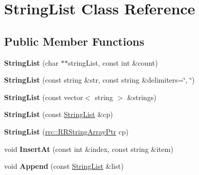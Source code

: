 \hypertarget{classrrc_1_1_string_list}{\section{String\-List Class Reference}
\label{classrrc_1_1_string_list}
}
\subsection*{Public Member Functions}
\begin{DoxyCompactItemize}
\item 
\hypertarget{classrrc_1_1_string_list_ae1e0bca30bc21edd66e7dd2b539273f4}{{\bfseries String\-List} (char $\ast$$\ast$string\-List, const int \&count)}\label{classrrc_1_1_string_list_ae1e0bca30bc21edd66e7dd2b539273f4}

\item 
\hypertarget{classrrc_1_1_string_list_a6306d63c1e79ab13cb62c1937722a06f}{{\bfseries String\-List} (const string \&str, const string \&delimiters=\char`\"{}, \char`\"{})}\label{classrrc_1_1_string_list_a6306d63c1e79ab13cb62c1937722a06f}

\item 
\hypertarget{classrrc_1_1_string_list_aec20e4743e6cebb9a3c14f04eee6ea5b}{{\bfseries String\-List} (const vector$<$ string $>$ \&strings)}\label{classrrc_1_1_string_list_aec20e4743e6cebb9a3c14f04eee6ea5b}

\item 
\hypertarget{classrrc_1_1_string_list_a2c6607735f8c410ce3ab82c1b88fc6f7}{{\bfseries String\-List} (const \hyperlink{classrrc_1_1_string_list}{String\-List} \&cp)}\label{classrrc_1_1_string_list_a2c6607735f8c410ce3ab82c1b88fc6f7}

\item 
\hypertarget{classrrc_1_1_string_list_a6dcfcea51506e87c9bbb2cf3f65751f7}{{\bfseries String\-List} (\hyperlink{rrc__types_8h_a7c9475df6c7337d99482b13a365e7596}{rrc\-::\-R\-R\-String\-Array\-Ptr} cp)}\label{classrrc_1_1_string_list_a6dcfcea51506e87c9bbb2cf3f65751f7}

\item 
\hypertarget{classrrc_1_1_string_list_ac3831ed58535977c2188dff41fbd2bcd}{void {\bfseries Insert\-At} (const int \&index, const string \&item)}\label{classrrc_1_1_string_list_ac3831ed58535977c2188dff41fbd2bcd}

\item 
\hypertarget{classrrc_1_1_string_list_aff1a1c047f187d1c50ef09f7c803d9f9}{void {\bfseries Append} (const \hyperlink{classrrc_1_1_string_list}{String\-List} \&list)}\label{classrrc_1_1_string_list_aff1a1c047f187d1c50ef09f7c803d9f9}


\end{DoxyCompactItemize}

